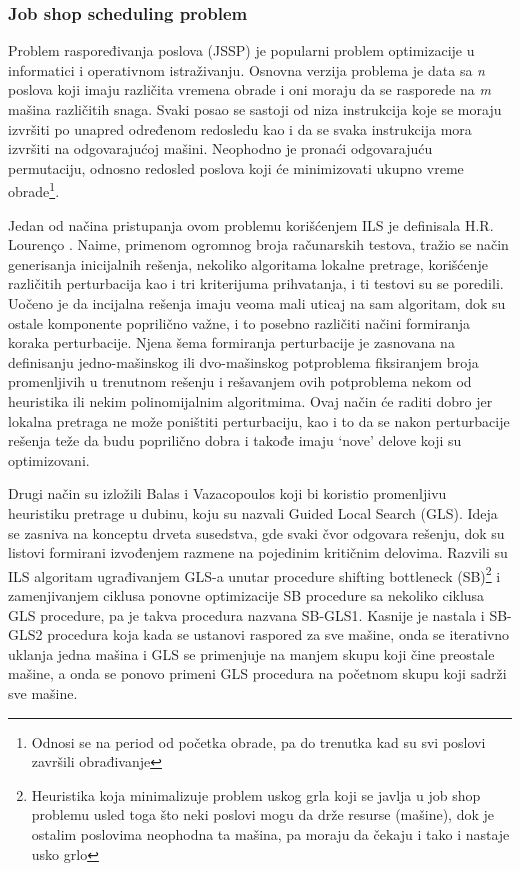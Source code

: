 \documentclass[a4paper]{article}
\begin{document}
\subsubsection{Job shop scheduling problem}
Problem raspoređivanja poslova (JSSP) je popularni problem optimizacije u informatici i operativnom istraživanju.
Osnovna verzija problema je data sa \textit{n} poslova koji imaju različita vremena obrade i oni moraju da se rasporede na \textit{m} mašina različitih snaga. Svaki posao se sastoji od niza instrukcija koje se moraju izvršiti po unapred određenom redosledu kao i da se svaka instrukcija mora izvršiti na odgovarajućoj mašini. Neophodno je pronaći odgovarajuću permutaciju, odnosno redosled poslova koji će minimizovati ukupno vreme obrade\footnote{Odnosi se na period od početka obrade, pa do trenutka kad su svi poslovi završili obrađivanje}.

Jedan od načina pristupanja ovom problemu korišćenjem ILS je definisala H.R. Lourenço \cite{jobShopScheduling}. Naime, primenom ogromnog broja računarskih testova, tražio se način generisanja inicijalnih rešenja, nekoliko algoritama lokalne pretrage, korišćenje različitih perturbacija kao i tri kriterijuma prihvatanja, i ti testovi su se poredili. Uočeno je da incijalna rešenja imaju veoma mali uticaj na sam algoritam, dok su ostale komponente poprilično važne, i to posebno različiti načini formiranja koraka perturbacije. Njena šema formiranja perturbacije je zasnovana na definisanju jedno-mašinskog ili dvo-mašinskog potproblema fiksiranjem broja promenljivih u trenutnom rešenju i rešavanjem ovih potproblema nekom od heuristika ili nekim polinomijalnim algoritmima. Ovaj način će raditi dobro jer lokalna pretraga ne može poništiti perturbaciju, kao i to da se nakon perturbacije rešenja teže da budu poprilično dobra i takođe imaju \enquote*{nove} delove koji su optimizovani.

Drugi način su izložili Balas i Vazacopoulos koji bi koristio promenljivu heuristiku pretrage u dubinu, koju su nazvali Guided Local Search (GLS). Ideja se zasniva na konceptu drveta susedstva, gde svaki čvor odgovara rešenju, dok su listovi formirani izvođenjem razmene na pojedinim kritičnim delovima. Razvili su ILS algoritam ugrađivanjem GLS-a unutar procedure shifting bottleneck (SB)\footnote{Heuristika koja minimalizuje problem uskog grla koji se javlja u job shop problemu usled toga što neki poslovi mogu da drže resurse (mašine), dok je ostalim poslovima neophodna ta mašina, pa moraju da čekaju i tako i nastaje usko grlo} i zamenjivanjem ciklusa ponovne optimizacije SB procedure sa nekoliko ciklusa GLS procedure, pa je takva procedura nazvana SB-GLS1. Kasnije je nastala i SB-GLS2 procedura koja kada se ustanovi raspored za sve mašine, onda se iterativno uklanja jedna mašina i GLS se primenjuje na manjem skupu koji čine preostale mašine, a onda se ponovo primeni GLS procedura na početnom skupu koji sadrži sve mašine.
\end{document}
